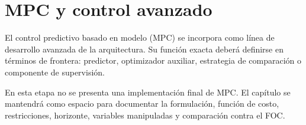 \section{MPC y control avanzado}

El control predictivo basado en modelo (MPC) se incorpora como línea de desarrollo avanzada de la arquitectura. Su función exacta deberá definirse en términos de frontera: predictor, optimizador auxiliar, estrategia de comparación o componente de supervisión.

En esta etapa no se presenta una implementación final de MPC. El capítulo se mantendrá como espacio para documentar la formulación, función de costo, restricciones, horizonte, variables manipuladas y comparación contra el FOC.
